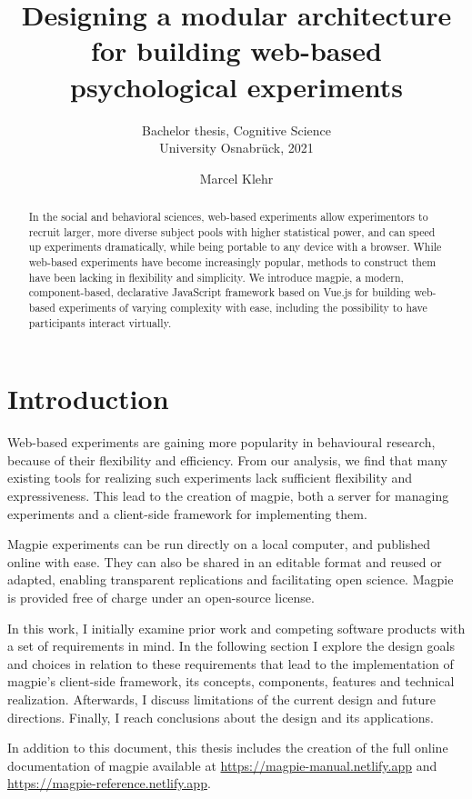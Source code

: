 \documentclass[a4paper,10pt]{paper}
\title{Designing a modular architecture for building web-based psychological experiments}
\subtitle{
Bachelor thesis, Cognitive Science \\
University Osnabrück, 2021}
\author{Marcel Klehr}
\begin{document}
\maketitle
\begin{abstract}
In the social and behavioral sciences, web-based experiments allow experimentors to recruit larger, more diverse subject pools with higher statistical power, and can speed up experiments dramatically, while being portable to any device with a browser. While web-based experiments have become increasingly popular, methods to construct them have been lacking in flexibility and simplicity. We introduce magpie, a modern, component-based, declarative JavaScript framework based on Vue.js for building web-based experiments of varying complexity with ease, including the possibility to have participants interact virtually.
\end{abstract}
\newpage 

\tableofcontents
\newpage 


\section{Introduction}
Web-based experiments are gaining more popularity in behavioural research, because of their flexibility and efficiency. From our analysis, we find that many existing tools for realizing such experiments lack sufficient flexibility and expressiveness. This lead to the creation of magpie, both a server for managing experiments and a client-side framework for implementing them.

Magpie experiments can be run directly on a local computer, and published online with ease. They can also be shared in an editable format and reused or adapted, enabling transparent replications and facilitating open science. Magpie is provided free of charge under an open-source license.

In this work, I initially examine prior work and competing software products with a set of requirements in mind. In the following section I explore the design goals and choices in relation to these requirements that lead to the implementation of magpie's client-side framework, its concepts, components, features and technical realization. Afterwards, I discuss limitations of the current design and future directions. Finally, I reach conclusions about the design and its applications.

In addition to this document, this thesis includes the creation of the full online documentation of magpie available at \url{https://magpie-manual.netlify.app} and \url{https://magpie-reference.netlify.app}.
\end{document}

